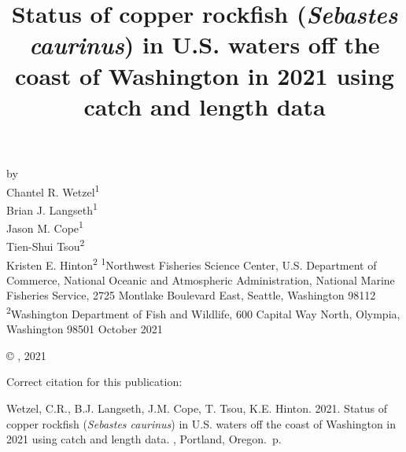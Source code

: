 \documentclass[11pt,
  english,
  a4paper,
]{article}
\date{}
\newcommand{\trTitle}{Status of copper rockfish (\emph{Sebastes caurinus}) in U.S. waters off the coast of Washington in 2021 using catch and length data}
\newcommand{\trYear}{2021}
\newcommand{\trMonth}{October}
\newcommand{\trAuthsBack}{Wetzel, C.R., B.J. Langseth, J.M. Cope, T. Tsou, K.E. Hinton}
\newcommand{\trCitation}{
\begin{hangparas}{1em}{1}
\trAuthsBack{}. \trYear{}. \trTitle{}. \glsentrylong{pfmc}, Portland, Oregon. \pageref{LastPage}{}\,p.
\end{hangparas}}
\begin{document}

\renewcommand*{\thefootnote}{\fnsymbol{footnote}}

\small
\thispagestyle{empty}
\noindent
\begin{center}
\title{Status of copper rockfish (\emph{Sebastes caurinus}) in U.S. waters off the coast of Washington in 2021 using catch and length data}
\vspace{1.5cm}
{\Large\textbf{}}
\vfill
by\\
Chantel R. Wetzel\textsuperscript{1}\\
Brian J. Langseth\textsuperscript{1}\\
Jason M. Cope\textsuperscript{1}\\
Tien-Shui Tsou\textsuperscript{2}\\
Kristen E. Hinton\textsuperscript{2}\vfill
\textsuperscript{1}Northwest Fisheries Science Center, U.S. Department of Commerce, National Oceanic and Atmospheric Administration, National Marine Fisheries Service, 2725 Montlake Boulevard East, Seattle, Washington 98112\\
\textsuperscript{2}Washington Department of Fish and Wildlife, 600 Capital Way North, Olympia, Washington 98501\vfill
\trMonth{} \trYear{}
\end{center}
\clearpage

\thispagestyle{empty}
\vspace*{\fill}
\begin{center}
\copyright{} , \trYear{}\\
\end{center}
\par
\bigskip
\noindent
Correct citation for this publication:
\bigskip
\par
\trCitation{}
\clearpage


\tableofcontents\clearpage
\label{TRlastRoman}
\clearpage

\newpage
\thispagestyle{empty} %

\pagestyle{plain}  %
\renewcommand*{\thefootnote}{\arabic{footnote}}  %
\setcounter{footnote}{0}  %
\renewcommand{\headrulewidth}{0.5pt}
\renewcommand{\footrulewidth}{0.5pt}
\end{document}
